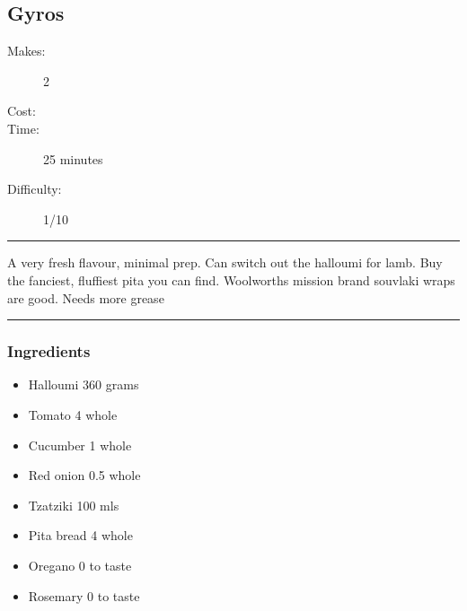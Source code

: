 \documentclass[]{article}
\begin{document}
\subsection*{\center\huge Gyros}
\begin{description}
\item[Makes:] 2 
\item[Cost:] \textdollar
\item[Time:] 25 minutes
\item[Difficulty:] 1/10
\end{description}
\vspace{0.2cm}\hrule\vspace{0.5cm}
\begin{adjustwidth}{0.5 cm}{0.5 cm}

A very fresh flavour, minimal prep. Can switch out the halloumi for lamb. Buy the fanciest, fluffiest pita you can find. Woolworths mission brand souvlaki wraps are good. Needs more grease \hfill{}\color{black}

\end{adjustwidth}
\vspace{0.5cm}\hrule
\subsubsection*{\Large Ingredients}
\begin{multicols}{2}
\begin{itemize}
 \item Halloumi \hfill 360 grams
 \item Tomato \hfill 4 whole
 \item Cucumber \hfill 1 whole
 \item Red onion \hfill 0.5 whole
 \item Tzatziki \hfill 100 mls
 \item Pita bread \hfill 4 whole
 \item Oregano \hfill 0 to taste
 \item Rosemary \hfill 0 to taste
\end{itemize}
\end{multicols}
\end{document}
